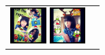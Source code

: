 \documentclass{acm_proc_article-sp}
\newcommand{\thumbheight}{14mm}
\newenvironment{thumbsequence}{}{\makebox[4mm]{}}
\begin{document}
\begin{figure}
\begin{tabular}{p{}p{}}
\begin{thumbsequence}
		\includegraphics[height=\thumbheight]{resources/ropes/looseduplicate10.jpg}
		\includegraphics[height=\thumbheight]{resources/ropes/looseduplicate11.jpg}
	\end{thumbsequence}

\end{tabular}
\end{figure}
\end{document}
